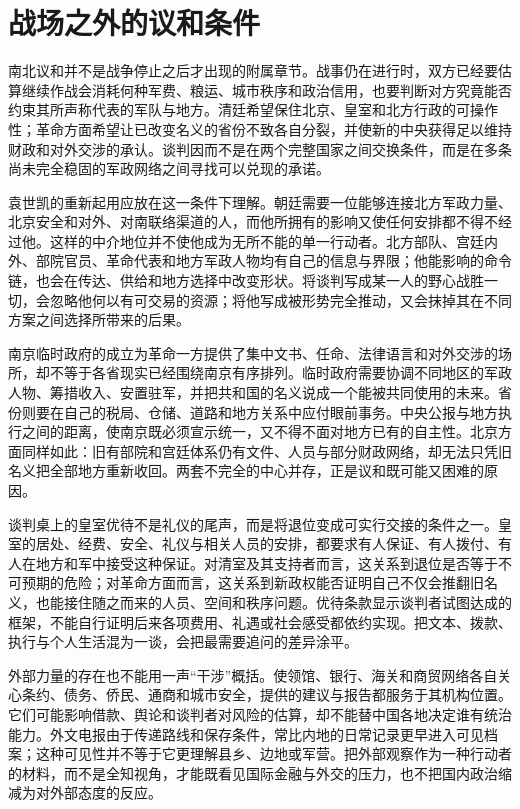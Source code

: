 \section{战场之外的议和条件}

南北议和并不是战争停止之后才出现的附属章节。战事仍在进行时，双方已经要估算继续作战会消耗何种军费、粮运、城市秩序和政治信用，也要判断对方究竟能否约束其所声称代表的军队与地方。清廷希望保住北京、皇室和北方行政的可操作性；革命方面希望让已改变名义的省份不致各自分裂，并使新的中央获得足以维持财政和对外交涉的承认。谈判因而不是在两个完整国家之间交换条件，而是在多条尚未完全稳固的军政网络之间寻找可以兑现的承诺。

袁世凯的重新起用应放在这一条件下理解。朝廷需要一位能够连接北方军政力量、北京安全和对外、对南联络渠道的人，而他所拥有的影响又使任何安排都不得不经过他。这样的中介地位并不使他成为无所不能的单一行动者。北方部队、宫廷内外、部院官员、革命代表和地方军政人物均有自己的信息与界限；他能影响的命令链，也会在传达、供给和地方选择中改变形状。将谈判写成某一人的野心战胜一切，会忽略他何以有可交易的资源；将他写成被形势完全推动，又会抹掉其在不同方案之间选择所带来的后果。

南京临时政府的成立为革命一方提供了集中文书、任命、法律语言和对外交涉的场所，却不等于各省现实已经围绕南京有序排列。临时政府需要协调不同地区的军政人物、筹措收入、安置驻军，并把共和国的名义说成一个能被共同使用的未来。省份则要在自己的税局、仓储、道路和地方关系中应付眼前事务。中央公报与地方执行之间的距离，使南京既必须宣示统一，又不得不面对地方已有的自主性。北京方面同样如此：旧有部院和宫廷体系仍有文件、人员与部分财政网络，却无法只凭旧名义把全部地方重新收回。两套不完全的中心并存，正是议和既可能又困难的原因。

谈判桌上的皇室优待不是礼仪的尾声，而是将退位变成可实行交接的条件之一。皇室的居处、经费、安全、礼仪与相关人员的安排，都要求有人保证、有人拨付、有人在地方和军中接受这种保证。对清室及其支持者而言，这关系到退位是否等于不可预期的危险；对革命方面而言，这关系到新政权能否证明自己不仅会推翻旧名义，也能接住随之而来的人员、空间和秩序问题。优待条款显示谈判者试图达成的框架，不能自行证明后来各项费用、礼遇或社会感受都依约实现。把文本、拨款、执行与个人生活混为一谈，会把最需要追问的差异涂平。

外部力量的存在也不能用一声“干涉”概括。使领馆、银行、海关和商贸网络各自关心条约、债务、侨民、通商和城市安全，提供的建议与报告都服务于其机构位置。它们可能影响借款、舆论和谈判者对风险的估算，却不能替中国各地决定谁有统治能力。外文电报由于传递路线和保存条件，常比内地的日常记录更早进入可见档案；这种可见性并不等于它更理解县乡、边地或军营。把外部观察作为一种行动者的材料，而不是全知视角，才能既看见国际金融与外交的压力，也不把国内政治缩减为对外部态度的反应。

